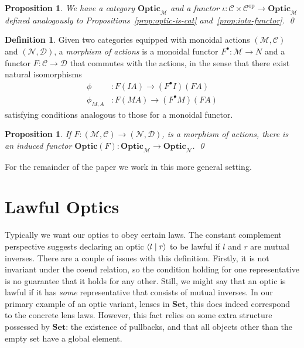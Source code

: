 \documentclass[11pt,letterpaper]{article}
\theoremstyle{plain}
\newtheorem{proposition}[theorem]{Proposition}
\theoremstyle{definition}
\newtheorem{definition}[theorem]{Definition}
\newcommand{\C}{\mathscr{C}}
\newcommand{\D}{\mathscr{D}}
\newcommand{\M}{\mathscr{M}}
\newcommand{\N}{\mathscr{N}}
\newcommand{\Set}{\mathbf{Set}}
\newcommand{\Optic}{\mathbf{Optic}}
\newcommand{\op}{\mathrm{op}}
\newcommand{\rep}[2]{{\ensuremath \left\langle #1 \mid #2 \right\rangle}}
\newcommand{\todo}[1]{\textcolor{red}{\small #1}}
\begin{document}
\begin{proposition}
  We have a category $\Optic_\M$ and a functor $\iota : \C \times \C^\op \to \Optic_\M$ defined analogously to Propositions~\ref{prop:optic-is-cat} and~\ref{prop:iota-functor}. \qed
\end{proposition}

\begin{definition}
Given two categories equipped with monoidal actions $(\M, \C)$ and $(\N, \D)$, a \emph{morphism of actions} is a monoidal functor $F^\bullet : \M \to N$ and a functor $F : \C \to \D$ that commutes with the actions, in the sense that there exist natural isomorphisms
  \begin{align*}
  \phi &: F(I A) \to (F^\bullet I)(FA) \\
  \phi_{M,A} &: F(MA) \to (F^\bullet M)(F A)
  \end{align*}
satisfying conditions analogous to those for a monoidal functor.

\end{definition}

\begin{proposition}\label{prop:change-of-action}
If $F : (\M, \C) \to (\N, \D)$, is a morphism of actions, there is an induced functor $\Optic(F) : \Optic_\M \to \Optic_\N$. \qed
\end{proposition}

For the remainder of the paper we work in this more general setting. 

\section{Lawful Optics}\label{sec:lawful-optics}
Typically we want our optics to obey certain laws. The constant complement perspective suggests declaring an optic $\rep{l}{r}$ to be lawful if $l$ and $r$ are mutual inverses. There are a couple of issues with this definition. Firstly, it is not invariant under the coend relation, so the condition holding for one representative is no guarantee that it holds for any other. Still, we might say that an optic is lawful if it has \emph{some} representative that consists of mutual inverses. In our primary example of an optic variant, lenses in $\Set$, this does indeed correspond to the concrete lens laws. However, this fact relies on some extra structure possessed by $\Set$: the existence of pullbacks, and that all objects other than the empty set have a global element.
\end{document}

